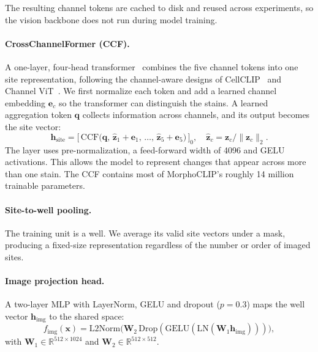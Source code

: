 The resulting channel tokens are cached to disk and reused across experiments, so the vision
backbone does not run during model training.

\paragraph{CrossChannelFormer (CCF).}
A one-layer, four-head transformer~\cite{vaswani2017attention} combines the five channel tokens
into one site representation, following the channel-aware designs of CellCLIP~\cite{lu2025cellclip}
and Channel ViT~\cite{bao2024channelvit}. We first normalize each token and add a learned channel
embedding $\mathbf{e}_c$ so the transformer can distinguish the stains. A learned aggregation token
$\mathbf{q}$ collects information across channels, and its output becomes the site vector:
\begin{equation}
  \mathbf{h}_{\text{site}}
  = \bigl[\,\text{CCF}\bigl(
    \mathbf{q},\,
    \hat{\mathbf{z}}_1 + \mathbf{e}_1,\,
    \dots,\,
    \hat{\mathbf{z}}_5 + \mathbf{e}_5
    \bigr)\,\bigr]_{0},
  \quad
  \hat{\mathbf{z}}_c = \mathbf{z}_c / \|\mathbf{z}_c\|_2 .
\end{equation}
The layer uses pre-normalization, a feed-forward width of 4096 and GELU activations. This allows
the model to represent changes that appear across more than one stain. The CCF contains most of
MorphoCLIP's roughly 14 million trainable parameters.

\paragraph{Site-to-well pooling.}
The training unit is a well. We average its valid site vectors under a mask, producing a fixed-size
representation regardless of the number or order of imaged sites.

\paragraph{Image projection head.}
A two-layer MLP with LayerNorm, GELU and dropout ($p = 0.3$) maps the well vector
$\mathbf{h}_{\text{img}}$ to the shared space:
\begin{equation}
  f_{\text{img}}(\mathbf{x})
  = \text{L2Norm}\bigl(
  \mathbf{W}_2\,
  \text{Drop}(\text{GELU}(\text{LN}(\mathbf{W}_1 \mathbf{h}_{\text{img}})))
  \bigr),
\end{equation}
with $\mathbf{W}_1 \in \mathbb{R}^{512 \times 1024}$ and
$\mathbf{W}_2 \in \mathbb{R}^{512 \times 512}$.

